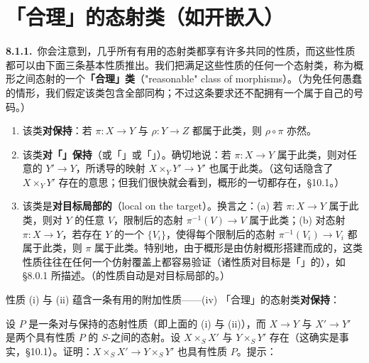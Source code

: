 
\section{「合理」的态射类（如开嵌入）}

\textbf{8.1.1.}\ 你会注意到，几乎所有有用的态射类都享有许多共同的性质，而这些性质都可以由下面三条基本性质推出。我们把满足这些性质的任何一个态射类，称为概形之间态射的一个\textbf{「合理」类}（"reasonable" class of morphisms）。（为免任何愚蠢的情形，我们假定该类包含全部同构；不过这条要求还不配拥有一个属于自己的号码。）
\begin{enumerate}[label=(\roman*)]
  \item 该类\textbf{对\trComposition{}保持}：若 $\pi\colon X\to Y$ 与 $\rho\colon Y\to Z$ 都属于此类，则 $\rho\circ\pi$ 亦然。
  \item 该类\textbf{对「\trBaseChange」保持}（或「\trPullback」或「\trFiberProduct」）。确切地说：若 $\pi\colon X\to Y$ 属于此类，则对任意的 $Y'\to Y$，所诱导的映射 $X\times_Y Y'\to Y'$ 也属于此类。（这句话隐含了\trFiberProduct{} $X\times_Y Y'$ 存在的意思；但我们很快就会看到，概形的一切\trFiberProduct{}都存在，\S10.1。）
  \item 该类是\textbf{对目标局部的}（local on the target）。换言之：(a) 若 $\pi\colon X\to Y$ 属于此类，则对 $Y$ 的任意\trOpenSubset{} $V$，限制后的态射 $\pi^{-1}(V)\to V$ 属于此类；(b) 对态射 $\pi\colon X\to Y$，若存在 $Y$ 的一个\trOpenCover{} $\{V_i\}$，使得每个限制后的态射 $\pi^{-1}(V_i)\to V_i$ 都属于此类，则 $\pi$ 属于此类。特别地，由于概形是由仿射概形搭建而成的，这类性质往往在任何一个仿射覆盖上都容易验证（诸性质对目标是「\trAffineLocal」的），如 \S8.0.1 所描述。（\trStalkLocal{}的性质自动是对目标局部的。）
\end{enumerate}

性质 (i) 与 (ii) 蕴含一条有用的附加性质——(iv) 「合理」的态射类\textbf{对\trProduct{}保持}：

\begin{exercise}\label{ex:property-product-preserved}
设 $P$ 是一条对\trComposition{}与\trBaseChange{}保持的态射性质（即上面的 (i) 与 (ii)），而 $X\to Y$ 与 $X'\to Y'$ 是两个具有性质 $P$ 的 $S$-\trScheme{}之间的态射。设 $X\times_S X'$ 与 $Y\times_S Y'$ 存在（这确实是事实，\S10.1）。证明：$X\times_S X'\to Y\times_S Y'$ 也具有性质 $P$。提示：
\end{exercise}

